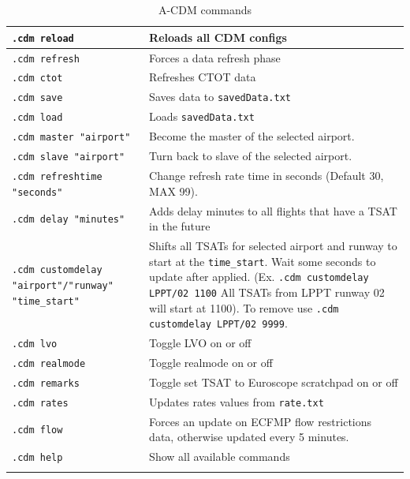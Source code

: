 \documentclass[a4paper,oneside,11pt]{memoir}
\begin{document}
\begin{longtable}{|p{5cm}|p{8.5cm}|}
  \hline
  \texttt{.cdm reload}                                      & Reloads all CDM configs\\ \hline
  \texttt{.cdm refresh}                                     & Forces a data refresh phase\\ \hline
  \texttt{.cdm ctot}                                        & Refreshes CTOT data\\ \hline
  \texttt{.cdm save}                                        & Saves data to \texttt{savedData.txt}\\ \hline
  \texttt{.cdm load}                                        & Loads \texttt{savedData.txt}\\ \hline
  \texttt{.cdm master "airport"}                            & Become the master of the selected airport.\\ \hline
  \texttt{.cdm slave "airport"}                             & Turn back to slave of the selected airport.\\ \hline
  \texttt{.cdm refreshtime "seconds"}                       & Change refresh rate time in seconds (Default 30, MAX 99).\\ \hline
  \texttt{.cdm delay "minutes"}                             & Adds delay minutes to all flights that have a TSAT in the future\\ \hline
  \texttt{.cdm customdelay "airport"/"runway" "time\_start"} & Shifts all TSATs for selected airport and runway to start at the \texttt{time\_start}. Wait some seconds to update after applied. (Ex. \texttt{.cdm customdelay LPPT/02 1100} All TSATs from LPPT runway 02 will start at 1100). To remove use \texttt{.cdm customdelay LPPT/02 9999}.\\ \hline
  \texttt{.cdm lvo}                                         & Toggle LVO on or off\\ \hline
  \texttt{.cdm realmode}                                    & Toggle realmode on or off\\ \hline
  \texttt{.cdm remarks}                                     & Toggle set TSAT to Euroscope scratchpad on or off\\ \hline
  \texttt{.cdm rates}                                       & Updates rates values from \texttt{rate.txt}\\ \hline
  \texttt{.cdm flow }                                       & Forces an update on ECFMP flow restrictions data, otherwise updated every 5 minutes.\\ \hline
  \texttt{.cdm help}                                        & Show all available commands \\ \hline
  \caption{A-CDM commands}
  \label{tab:acdm-commands}
\end{longtable}
\end{document}

